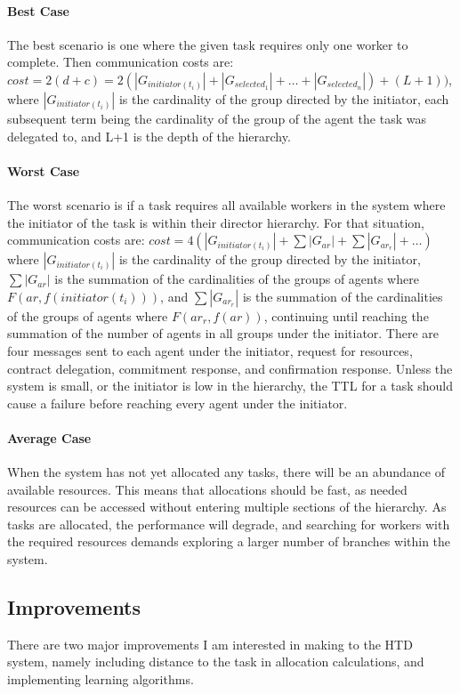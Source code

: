 \documentclass[12pt,letterpaper,onecolumn]{article}
\begin{document}
	\paragraph{Best Case}
	The best scenario is one where the given task requires only one worker to complete. Then communication costs are: $cost = 2(d + c) = 2(|G_{initiator(t_{i})}| + |G_{selected_{1}}| + \dots + |G_{selected_{n}}|) + (L+1))$, where $|G_{initiator(t_{i})}|$ is the cardinality of the group directed by the initiator, each subsequent term being the cardinality of the group of the agent the task was delegated to, and L+1 is the depth of the hierarchy.
	\paragraph{Worst Case}
	The worst scenario is if a task requires all available workers in the system where the initiator of the task is within their director hierarchy. For that situation, communication costs are: $cost = 4(|G_{initiator(t_{i})}| + \sum|G_{ar}| + \sum|G_{ar_{r}}| + \dots)$ where $|G_{initiator(t_{i})}|$ is the cardinality of the group directed by the initiator, $\sum|G_{ar}|$ is the summation of the cardinalities of the groups of agents where $F(ar, f(initiator(t_{i})))$, and $\sum|G_{ar_{r}}|$ is the summation of the cardinalities of the groups of agents where $F(ar_{r}, f(ar))$, continuing until reaching the summation of the number of agents in all groups under the initiator. There are four messages sent to each agent under the initiator, request for resources, contract delegation, commitment response, and confirmation response. Unless the system is small, or the initiator is low in the hierarchy, the TTL for a task should cause a failure before reaching every agent under the initiator.
	\paragraph{Average Case}
	When the system has not yet allocated any tasks, there will be an abundance of available resources. This means that allocations should be fast, as needed resources can be accessed without entering multiple sections of the hierarchy. As tasks are allocated, the performance will degrade, and searching for workers with the required resources demands exploring a larger number of branches within the system.
	\subsection{Improvements}
	There are two major improvements I am interested in making to the HTD system, namely including distance to the task in allocation calculations, and implementing learning algorithms.
\end{document}
